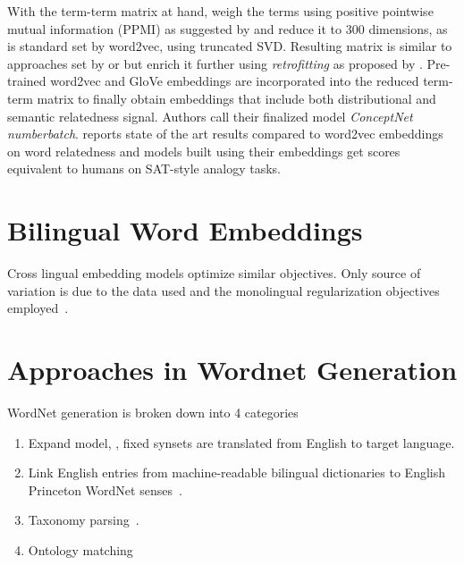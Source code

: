 With the term-term matrix at hand, \citeauthor{speer_conceptnet_2017} weigh the terms using positive pointwise mutual information (PPMI) as suggested by \textcite{levy_improving_2015} and reduce it to 300 dimensions, as is standard set by word2vec, using truncated SVD\@.
Resulting matrix is similar to approaches set by \textcite{deerwester_indexing_1990} or \textcite{pennington_glove_2014} but \citeauthor{speer_conceptnet_2017} enrich it further using \emph{retrofitting} as proposed by \textcite{faruqui_improving_2014}.
Pre-trained word2vec and GloVe embeddings are incorporated into the reduced term-term matrix to finally obtain embeddings that include both distributional and semantic relatedness signal.
Authors call their finalized model \emph{ConceptNet numberbatch}.
\citeauthor{speer_conceptnet_2017} reports state of the art results compared to word2vec embeddings on word relatedness and models built using their embeddings get scores equivalent to humans on SAT-style analogy tasks.

\section{Bilingual Word Embeddings}%
\label{sec:bilingual_word_embeddings}

Cross lingual embedding models optimize similar objectives.
Only source of variation is due to the data used and the monolingual regularization objectives employed~\cite{ruder_survey_2017}.

\section{Approaches in Wordnet Generation}%
\label{sec:approaches_in_wordnet_generation}

WordNet generation is broken down into 4 categories
\begin{enumerate}
    \item Expand model, \textcite{vossen_introduction_1998}, fixed synsets are translated from English to target language.
    \item Link English entries from machine-readable bilingual dictionaries to English Princeton WordNet senses~\textcite{knight_building_1994}.
    \item Taxonomy parsing~\textcite{farreres_using_1998}.
    \item Ontology matching~\textcite{farreres_towards_2004}
\end{enumerate}

